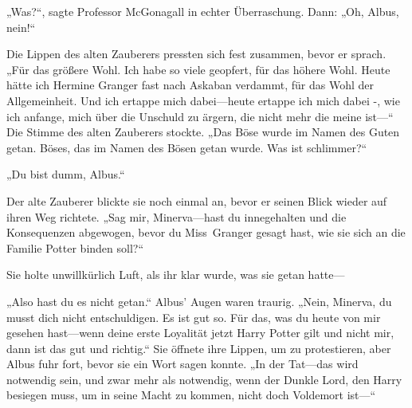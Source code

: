 „Was?“, sagte Professor McGonagall in echter Überraschung. Dann: „Oh, Albus, nein!“

Die Lippen des alten Zauberers pressten sich fest zusammen, bevor er sprach.
„Für das größere Wohl. Ich habe so viele geopfert, für das höhere Wohl. Heute hätte ich Hermine Granger fast nach Askaban verdammt, für das Wohl der Allgemeinheit. Und ich ertappe mich dabei—heute ertappe ich mich dabei -, wie ich anfange, mich über die Unschuld zu ärgern, die nicht mehr die meine ist—“
Die Stimme des alten Zauberers stockte.
„Das Böse wurde im Namen des Guten getan. Böses, das im Namen des Bösen getan wurde. Was ist schlimmer?“

„Du bist dumm, Albus.“

Der alte Zauberer blickte sie noch einmal an, bevor er seinen Blick wieder auf ihren Weg richtete. „Sag mir, Minerva—hast du innegehalten und die Konsequenzen abgewogen, bevor du Miss~Granger gesagt hast, wie sie sich an die Familie Potter binden soll?“

Sie holte unwillkürlich Luft, als ihr klar wurde, was sie getan hatte—

„Also hast du es nicht getan.“ Albus' Augen waren traurig. „Nein, Minerva, du musst dich nicht entschuldigen. Es ist gut so. Für das, was du heute von mir gesehen hast—wenn deine erste Loyalität jetzt Harry Potter gilt und nicht mir, dann ist das gut und richtig.“
Sie öffnete ihre Lippen, um zu protestieren, aber Albus fuhr fort, bevor sie ein Wort sagen konnte. „In der Tat—das wird notwendig sein, und zwar mehr als notwendig, wenn der Dunkle Lord, den Harry besiegen muss, um in seine Macht zu kommen, nicht doch Voldemort ist—“

